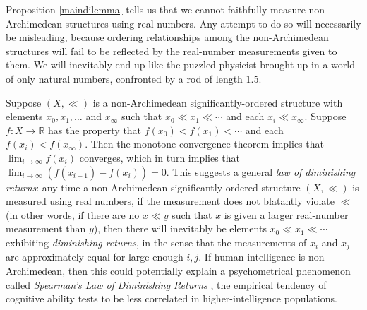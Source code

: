 \documentclass[reqno]{article}
\theoremstyle{definition}
\begin{document}
Proposition \ref{maindilemma} tells us that we cannot faithfully measure
non-Archimedean structures using real numbers.
Any attempt to do so will necessarily be misleading, because ordering
relationships among the non-Archimedean structures will fail to be reflected
by the real-number measurements given to them.
We will inevitably end up like the puzzled physicist
brought up in a world of only natural numbers, confronted by a rod of
length $1.5$.

Suppose $(X,\ll)$ is a non-Archimedean significantly-ordered structure
with elements $x_0,x_1,\ldots$ and $x_\infty$ such that
$x_0\ll x_1\ll\cdots$ and each $x_i\ll x_\infty$.
Suppose $f:X\to\mathbb R$ has the property that $f(x_0)<f(x_1)<\cdots$
and each $f(x_i)<f(x_\infty)$. Then the monotone convergence theorem implies
that $\lim_{i\to\infty}f(x_i)$ converges, which in turn implies that
$\lim_{i\to\infty}(f(x_{i+1})-f(x_i))=0$. This suggests a general \emph{law
of diminishing returns}: any time a non-Archimedean significantly-ordered
structure $(X,\ll)$ is measured using
real numbers, if the measurement does not blatantly violate $\ll$ (in other
words, if there are no $x\ll y$ such that $x$ is given a larger real-number
measurement than $y$), then there will inevitably be elements $x_0\ll x_1\ll \cdots$
exhibiting \emph{diminishing returns}, in the sense that the measurements of
$x_i$ and $x_j$ are approximately equal for large enough $i,j$.
If human intelligence is non-Archimedean, then this could potentially explain
a psychometrical phenomenon called \emph{Spearman's Law of Diminishing Returns}
\cite{spearman1927abilities} \cite{blum2017spearman}
\cite{hernandez2019ai}, the empirical
tendency of cognitive ability tests to be less correlated in
higher-intelligence populations.
\end{document}
